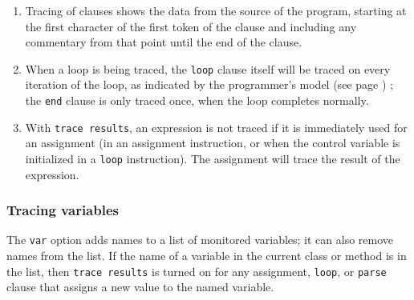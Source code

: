 \begin{enumerate}
\item Tracing of clauses shows the data from the source of the program,
starting at the first character of the first token of the clause and
including any commentary from that point until the end of the clause.
\item When a loop is being traced, the \texttt{loop} clause itself will be
traced on every iteration of the loop, as indicated by the
 programmer's model (see page \pageref{refloopmod}) ; the \texttt{end} clause is only
traced once, when the loop completes normally.
\item With \texttt{trace results}, an expression is not traced if it is
immediately used for an assignment (in an assignment instruction, or
when the control variable is initialized in a \texttt{loop}
instruction).
The assignment will trace the result of the expression.
\end{enumerate}
\subsubsection{Tracing variables}
 
The \texttt{var} option adds names to a list of monitored
variables; it can also remove names from the list.  If the name of a
variable in the current class or method is in the list, then \texttt{trace
results} is turned on for any assignment, \texttt{loop}, or
\texttt{parse} clause that assigns a new value to the named
variable.
 
